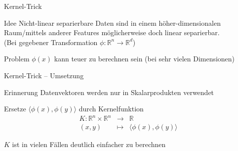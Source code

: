 \documentclass[xcolor={dvipsnames,svgnames}]{beamer}
\newcommand{\inner}[2]{\langle{} #1, #2 \rangle{}}
\begin{document}
\begin{frame}{Kernel-Trick}
  \begin{block}{Idee}
    Nicht-linear separierbare Daten sind in einem höher-dimensionalen
    Raum/mittels anderer Features möglicherweise doch linear separierbar. \\
    (Bei gegebener Transformation $\phi : \mathbb{R}^n \to \mathbb{R}^d$)
  \end{block}

  \begin{alertblock}{Problem}
    $\phi(x)$ kann teuer zu berechnen sein (bei sehr vielen Dimensionen)
  \end{alertblock}
\end{frame}

\begin{frame}{Kernel-Trick -- Umsetzung}
  \begin{block}{Erinnerung}
    Datenvektoren werden nur in Skalarprodukten verwendet
  \end{block}

  Ersetze $\inner{\phi(x)}{\phi(y)}$ durch Kernelfunktion
  \[
    \begin{array}{rcl}
      K : \mathbb{R}^n \times \mathbb{R}^n & \to & \mathbb{R} \\
      (x,y) & \mapsto & \inner{\phi(x)}{\phi(y)}
    \end{array}
  \]

  $K$ ist in vielen Fällen deutlich einfacher zu berechnen
\end{frame}
\end{document}
